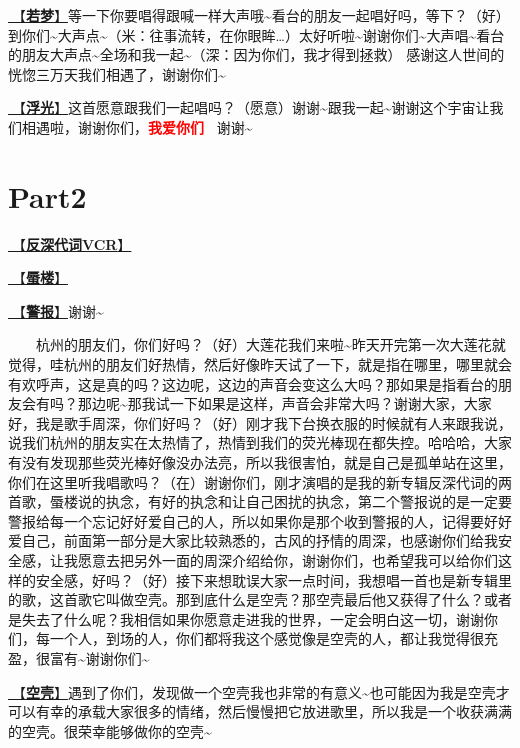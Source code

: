 \documentclass[]{ctexbook}
\begin{document}
\hyperref[ruomeng]{🎵【\textbf{若梦}】}等一下你要唱得跟喊一样大声哦\textasciitilde 看台的朋友一起唱好吗，等下？（好）到你们\textasciitilde 大声点\textasciitilde（米：往事流转，在你眼眸\ldots）太好听啦\textasciitilde 谢谢你们\textasciitilde 大声唱\textasciitilde 看台的朋友大声点\textasciitilde 全场和我一起\textasciitilde（深：因为你们，我才得到拯救）
感谢这人世间的恍惚三万天我们相遇了，谢谢你们\textasciitilde{}

\hyperref[floating-light]{🎵【\textbf{浮光}】}这首愿意跟我们一起唱吗？（愿意）谢谢\textasciitilde 跟我一起\textasciitilde 谢谢这个宇宙让我们相遇啦，谢谢你们，\textbf{\textcolor{red}{我爱你们~} } 谢谢\textasciitilde{}

\section{Part2}\label{hangzhou-20240824-part2}

\hyperref[senself-vcr]{🎥【\textbf{反深代词VCR}】}

\hyperref[mirage]{🎵【\textbf{蜃楼}】}

\hyperref[the-giver]{🎵【\textbf{警报}】}谢谢\textasciitilde{}

  杭州的朋友们，你们好吗？（好）大莲花我们来啦\textasciitilde 昨天开完第一次大莲花就觉得，哇杭州的朋友们好热情，然后好像昨天试了一下，就是指在哪里，哪里就会有欢呼声，这是真的吗？这边呢，这边的声音会变这么大吗？那如果是指看台的朋友会有吗？那边呢\textasciitilde 那我试一下如果是这样，声音会非常大吗？谢谢大家，大家好，我是歌手周深，你们好吗？（好）刚才我下台换衣服的时候就有人来跟我说，说我们杭州的朋友实在太热情了，热情到我们的荧光棒现在都失控。哈哈哈，大家有没有发现那些荧光棒好像没办法亮，所以我很害怕，就是自己是孤单站在这里，你们在这里听我唱歌吗？（在）谢谢你们，刚才演唱的是我的新专辑反深代词的两首歌，蜃楼说的执念，有好的执念和让自己困扰的执念，第二个警报说的是一定要警报给每一个忘记好好爱自己的人，所以如果你是那个收到警报的人，记得要好好爱自己，前面第一部分是大家比较熟悉的，古风的抒情的周深，也感谢你们给我安全感，让我愿意去把另外一面的周深介绍给你，谢谢你们，也希望我可以给你们这样的安全感，好吗？（好）接下来想耽误大家一点时间，我想唱一首也是新专辑里的歌，这首歌它叫做空壳。那到底什么是空壳？那空壳最后他又获得了什么？或者是失去了什么呢？我相信如果你愿意走进我的世界，一定会明白这一切，谢谢你们，每一个人，到场的人，你们都将我这个感觉像是空壳的人，都让我觉得很充盈，很富有\textasciitilde 谢谢你们\textasciitilde{}

\hyperref[shen]{🎵【\textbf{空壳}】}遇到了你们，发现做一个空壳我也非常的有意义\textasciitilde 也可能因为我是空壳才可以有幸的承载大家很多的情绪，然后慢慢把它放进歌里，所以我是一个收获满满的空壳。很荣幸能够做你的空壳\textasciitilde{}
\end{document}
